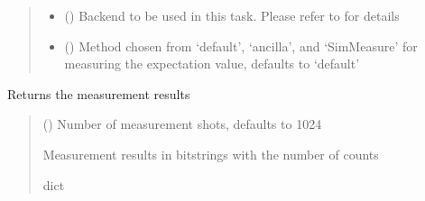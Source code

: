 \documentclass[letterpaper,10pt,english]{sphinxmanual}
\begin{document}
\begin{fulllineitems}
\begin{quote}
\begin{description}
\begin{itemize}
\item {} 
\sphinxAtStartPar
{} () \textendash{} Backend to be used in this task. Please refer to 
for details

\item {} 
\sphinxAtStartPar
{} () \textendash{} Method chosen from ‘default’, ‘ancilla’, and ‘SimMeasure’ for measuring the expectation
value, defaults to ‘default’

\end{itemize}

\end{description}\end{quote}

\begin{fulllineitems}
\label{\detokenize{qcompute_qapp.algorithm:qcompute_qapp.algorithm.VQE.get_measure}}
\pysigstartsignatures
{}
\pysigstopsignatures
\sphinxAtStartPar
Returns the measurement results
\begin{quote}\begin{description}
\sphinxAtStartPar
{} () \textendash{} Number of measurement shots, defaults to 1024

\sphinxAtStartPar
Measurement results in bitstrings with the number of counts

\sphinxAtStartPar
dict

\end{description}\end{quote}

\end{fulllineitems}



\end{fulllineitems}
\end{document}
